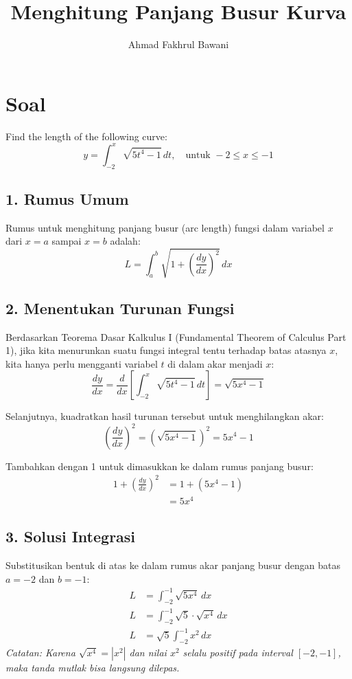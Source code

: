 \documentclass[12pt,a4paper]{article}
\title{Menghitung Panjang Busur Kurva}
\author{Ahmad Fakhrul Bawani}
\date{}
\begin{document}
\maketitle

\section*{Soal}

Find the length of the following curve:
\begin{equation*}
  y = \int_{-2}^{x} \sqrt{5t^4 - 1} \, dt, \quad \text{untuk } -2 \le x \le -1
\end{equation*}

\subsection*{1. Rumus Umum}
Rumus untuk menghitung panjang busur (arc length) fungsi dalam variabel $x$ dari $x = a$ sampai $x = b$ adalah:
\begin{equation*}
  L = \int_{a}^{b} \sqrt{1 + \left(\frac{dy}{dx}\right)^2} \, dx
\end{equation*}

\subsection*{2. Menentukan Turunan Fungsi}
Berdasarkan Teorema Dasar Kalkulus I (Fundamental Theorem of Calculus Part 1), jika kita menurunkan suatu fungsi integral tentu terhadap batas atasnya $x$, kita hanya perlu mengganti variabel $t$ di dalam akar menjadi $x$:
\begin{equation*}
  \frac{dy}{dx} = \frac{d}{dx} \left[ \int_{-2}^{x} \sqrt{5t^4 - 1} \, dt \right] = \sqrt{5x^4 - 1}
\end{equation*}

Selanjutnya, kuadratkan hasil turunan tersebut untuk menghilangkan akar:
\begin{equation*}
  \left(\frac{dy}{dx}\right)^2 = \left(\sqrt{5x^4 - 1}\right)^2 = 5x^4 - 1
\end{equation*}

Tambahkan dengan 1 untuk dimasukkan ke dalam rumus panjang busur:
\begin{align*}
  1 + \left(\frac{dy}{dx}\right)^2 &= 1 + (5x^4 - 1) \\
  &= 5x^4
\end{align*}

\subsection*{3. Solusi Integrasi}
Substitusikan bentuk di atas ke dalam rumus akar panjang busur dengan batas $a = -2$ dan $b = -1$:
\begin{align*}
  L &= \int_{-2}^{-1} \sqrt{5x^4} \, dx \\
  L &= \int_{-2}^{-1} \sqrt{5} \cdot \sqrt{x^4} \, dx \\
  L &= \sqrt{5} \int_{-2}^{-1} x^2 \, dx
\end{align*}
\textit{Catatan: Karena $\sqrt{x^4} = |x^2|$ dan nilai $x^2$ selalu positif pada interval $[-2, -1]$, maka tanda mutlak bisa langsung dilepas.}
\end{document}
